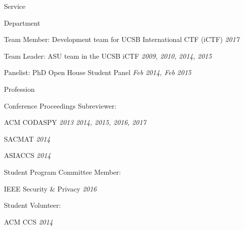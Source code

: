 
\begin{rSection}{Service}

  \begin{rBulletSubsection}{Department}

    \item Team Member: Development team for UCSB International CTF (iCTF) \hfill \emph{2017}

    \item Team Leader: ASU team in the UCSB iCTF \hfill \emph{2009, 2010, 2014, 2015}

    \item Panelist: PhD Open House Student Panel \hfill \emph{Feb 2014, Feb 2015}

  \end{rBulletSubsection}

  \begin{rBulletSubsection}{Profession}

    \item Conference Proceedings Subreviewer:
      \begin{rBulletList}

        \item ACM CODASPY \hfill \emph{2013 2014, 2015, 2016, 2017}

        \item SACMAT \hfill \emph{2014}

        \item ASIACCS \hfill \emph{2014}

      \end{rBulletList}

    \item Student Program Committee Member:
      \begin{rBulletList}

        \item IEEE Security \& Privacy \hfill \emph{2016}

      \end{rBulletList}

    \item Student Volunteer:
      \begin{rBulletList}

        \item ACM CCS \hfill \emph{2014}

      \end{rBulletList}

  \end{rBulletSubsection}


\end{rSection}
